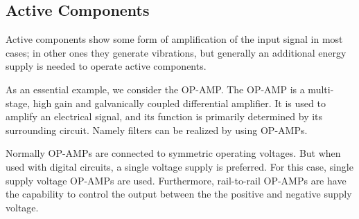 




\subsection{Active Components}
Active components show some form of amplification of the input signal in most cases; in other ones they generate vibrations, but generally an additional energy supply is needed to operate active components.

As an essential example, we consider the \acf{OP-AMP}. The \ac{OP-AMP} is a multi-stage, high gain and galvanically coupled differential amplifier. It is used to amplify an electrical signal, and its function is primarily determined by its surrounding circuit. Namely filters can be realized by using \ac{OP-AMP}s.

Normally \ac{OP-AMP}s are connected to symmetric operating voltages. But when used with digital circuits, a single voltage supply is preferred. For this case, single supply voltage \ac{OP-AMP}s are used. Furthermore, rail-to-rail \ac{OP-AMP}s are have the capability to control the output between the the positive and negative supply voltage.

